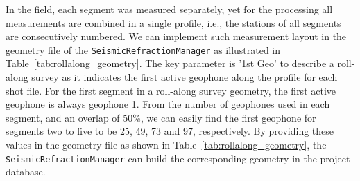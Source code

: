\documentclass[a4paper,fleqn]{cas-sc}
\begin{document}
In the field, each segment was measured separately, yet for the processing all measurements are combined in a single profile, i.e., the stations of all segments are consecutively numbered.
We can implement such measurement layout in the geometry file of the \texttt{SeismicRefractionManager} as illustrated in Table~\ref{tab:rollalong_geometry}. The key parameter is '1st Geo' to describe a roll-along survey as it indicates the first active geophone along the profile for each shot file. For the first segment in a roll-along survey geometry, the first active geophone is always geophone 1. From the number of geophones used in each segment, and an overlap of 50\%, we can easily find the first geophone for segments two to five to be 25, 49, 73 and 97, respectively. By providing these values in the geometry file as shown in Table~\ref{tab:rollalong_geometry}, the \texttt{SeismicRefractionManager} can build the corresponding geometry in the project database.
\end{document}
